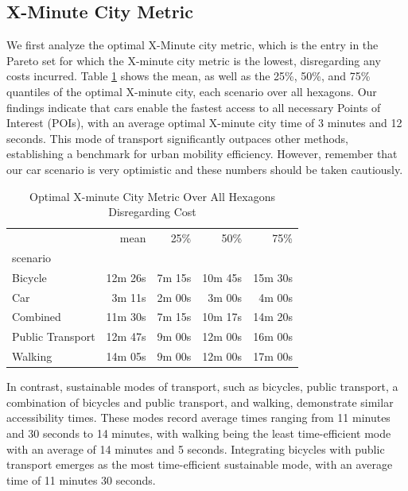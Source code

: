 \subsection{X-Minute City Metric}
\label{subsec:15_minute_city_metric}

We first analyze the optimal X-Minute city metric, which is the entry in the Pareto set for which the X-minute city metric is the lowest, disregarding any costs incurred.
Table \ref{tab:optimal_x_minute_city_metric} shows the mean, as well as the 25\%, 50\%, and 75\% quantiles of the optimal X-minute city, each scenario over all hexagons.
Our findings indicate that cars enable the fastest access to all necessary Points of Interest (POIs), with an average optimal X-minute city time of 3 minutes and 12 seconds. 
This mode of transport significantly outpaces other methods, establishing a benchmark for urban mobility efficiency.
However, remember that our car scenario is very optimistic and these numbers should be taken cautiously.

\begin{table}
  \caption{Optimal X-minute City Metric Over All Hexagons Disregarding Cost}
  \label{tab:optimal_x_minute_city_metric}
  \begin{center}
    \begin{tabular}{lrrrr}
    & mean & 25\% & 50\% & 75\% \\
    scenario &  &  &  &  \\
    Bicycle & 12m 26s & 7m 15s & 10m 45s & 15m 30s \\
    Car & 3m 11s & 2m 00s & 3m 00s & 4m 00s \\
    Combined & 11m 30s & 7m 15s & 10m 17s & 14m 20s \\
    Public Transport & 12m 47s & 9m 00s & 12m 00s & 16m 00s \\
    Walking & 14m 05s & 9m 00s & 12m 00s & 17m 00s \\
    \end{tabular}
  \end{center}
\end{table}

In contrast, sustainable modes of transport, such as bicycles, public transport, a combination of bicycles and public transport, and walking, demonstrate similar accessibility times. 
These modes record average times ranging from 11 minutes and 30 seconds to 14 minutes, with walking being the least time-efficient mode with an average of 14 minutes and 5 seconds. 
Integrating bicycles with public transport emerges as the most time-efficient sustainable mode, with an average time of 11 minutes 30 seconds. 

